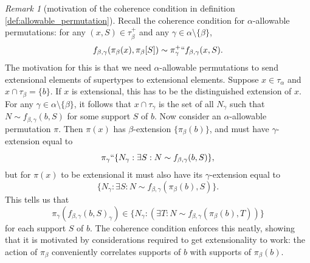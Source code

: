 \documentclass{article}
\theoremstyle{definition}
\theoremstyle{remark}
\newtheorem{remark}[theorem]{Remark}
\begin{document}
{%

\begin{remark}[motivation of the coherence condition in definition \ref{def:allowable_permutation}]\label{rk:motivate_coherence_condition}
Recall the coherence condition for $\alpha$-allowable permutations: for any $(x, S) \in \tau_\beta^+$ and any $\gamma \in \alpha \setminus \{\beta\}$,
$$f_{\beta,\gamma}(\pi_\beta(x),\pi_{\beta}[S]) \sim \pi_\gamma^+``f_{\beta,\gamma}(x,S).$$
The motivation for this is that we need $\alpha$-allowable permutations to send extensional elements of supertypes to extensional elements.  Suppose $x \in \tau_\alpha$ and
$x \cap \tau_\beta = \{b\}$.  If $x$ is extensional, this has to be the distinguished extension of $x$.  For any $\gamma \in \alpha \setminus \{\beta\}$,
it follows that $x \cap \tau_\gamma$ is the set of all $N_\gamma$ such that $N \sim f_{\beta,\gamma}(b,S)$ for some support $S$ of $b$.  Now consider an $\alpha$-allowable permutation $\pi$.  Then $\pi(x)$ has $\beta$-extension $\{\pi_\beta(b)\}$,  and must have $\gamma$-extension equal to $$\pi_\gamma``\{N_\gamma:\exists S:N \sim f_{\beta,\gamma}(b,S)\},$$
but for $\pi(x)$ to be extensional it must also have its $\gamma$-extension equal to $$\{N_\gamma:\exists S:N \sim f_{\beta,\gamma}(\pi_\beta(b),S)\}.$$  This tells us that $$\pi_\gamma(f_{\beta,\gamma}(b,S)_\gamma) \in \{N_\gamma:(\exists T:N \sim f_{\beta,\gamma}(\pi_\beta(b),T))\}$$ for each support $S$ of $b$.  The coherence condition enforces this neatly, showing that it is motivated by considerations required to get extensionality to work: the action of $\pi_\beta$ conveniently correlates supports of $b$ with supports of $\pi_\beta(b)$.

\end{remark}

}
\end{document}
